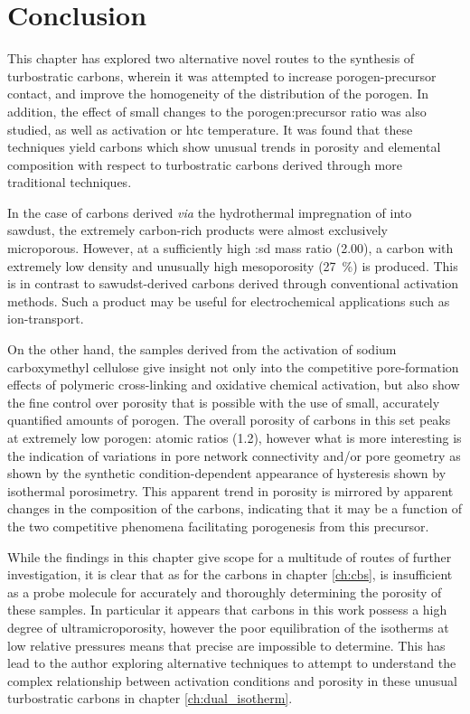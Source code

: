 \section{Conclusion}
\label{s:impregnation_conclusion}
This chapter has explored two alternative novel routes to the synthesis of \glspl{turbostratic carbon}, wherein it was attempted to increase \gls{porogen}-precursor contact, and improve the homogeneity of the distribution of the \gls{porogen}. In addition, the effect of small changes to the \gls{porogen}:precursor ratio was also studied, as well as \gls{activation} or \gls{htc} temperature. It was found that these techniques yield carbons which show unusual trends in porosity and elemental composition with respect to \glspl{turbostratic carbon} derived through more traditional techniques. 

In the case of carbons derived \textit{via} the hydrothermal impregnation of  into sawdust, the extremely carbon-rich products were almost exclusively microporous. However, at a sufficiently high :\acrshort{sd} mass ratio (2.00), a carbon with extremely low density and unusually high mesoporosity (\qty{27}{\percent}) is produced. This is in contrast to sawudst-derived carbons derived through conventional activation methods. Such a product may be useful for electrochemical applications such as ion-transport.

On the other hand, the samples derived from the activation of sodium carboxymethyl cellulose give insight not only into the competitive pore-formation effects of polymeric cross-linking and oxidative chemical activation, but also show the fine control over porosity that is possible with the use of small, accurately quantified amounts of \gls{porogen}. The overall porosity of carbons in this set peaks at extremely low \gls{porogen}: atomic ratios (1.2), however what is more interesting is the indication of variations in pore network connectivity and/or pore geometry as shown by the synthetic condition-dependent appearance of hysteresis shown by  isothermal porosimetry. This apparent trend in porosity is mirrored by apparent changes in the composition of the carbons, indicating that it may be a function of the two competitive phenomena facilitating porogenesis from this precursor.

While the findings in this chapter give scope for a multitude of routes of further investigation, it is clear that as for the carbons in chapter \ref{ch:cbs},  is insufficient as a probe molecule for accurately and thoroughly determining the porosity of these samples. In particular it appears that carbons in this work possess a high degree of ultramicroporosity, however the poor equilibration of the isotherms at low relative pressures means that precise  are impossible to determine. This has lead to the author exploring alternative techniques to attempt to understand the complex relationship between activation conditions and porosity in these unusual \glspl{turbostratic carbon} in chapter \ref{ch:dual_isotherm}.

